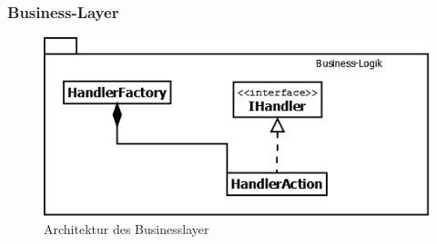 \subsubsection{Business-Layer}
\begin{figure}[H]
	\includegraphics[width=1.0\linewidth]{Images/BusinessLayer-Architektur}
	\caption{Architektur des Businesslayer}
	\label{fig:businesslayer-architektur}
\end{figure}

